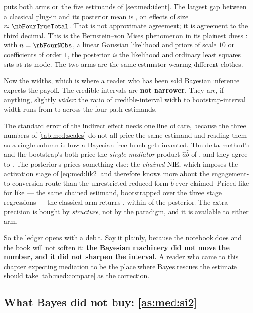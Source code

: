  puts both arms on the five estimands of \cref{sec:med:ident}. The largest gap
between a classical plug-in and its posterior mean is \nbFourMaxGap, on effects of size
$\approx \nbFourTrueTotal$. That is not approximate agreement; it is agreement to the third decimal.
This is the Bernstein--von Mises phenomenon in its plainest dress \citep{gelman2013}: with
$n = \nbFourNObs$, a linear Gaussian likelihood and priors of scale $10$ on coefficients of order
$1$, the posterior \emph{is} the likelihood and ordinary least squares sits at its mode. The two arms
are the same estimator wearing different clothes.

Now the widths, which is where a reader who has been sold Bayesian inference expects the payoff. The
credible intervals are \textbf{not narrower}. They are, if anything, slightly \emph{wider}: the ratio
of credible-interval width to bootstrap-interval width runs from \nbFourWidthMin{} to
\nbFourWidthMax{} across the four path estimands.

The standard error of the indirect effect needs one line of care, because the three numbers of
\cref{tab:med:scales} do not all price the same estimand and reading them as a single column is how
a Bayesian free lunch gets invented. The delta method's \nbFourSeDelta{} and the bootstrap's
\nbFourSeBoot{} both price the \emph{single-mediator} product $\hat a\hat b$ of
, and they agree to \pc{\nbFourSeGapPct}. The posterior's
\nbFourBayesNieSd{} prices something else: the \emph{chained} NIE, which imposes the activation
stage of \cref{eq:med:lik2} and therefore knows more about the engagement-to-conversion route than
the unrestricted reduced-form $\hat b$ ever claimed. Priced like for like --- the same chained
estimand, bootstrapped over the three stage regressions --- the classical arm returns
\nbFourSeBootChained, within \pc{\nbFourSeChainGapPct} of the posterior. The extra precision is
bought by \emph{structure}, not by the paradigm, and it is available to either arm.

So the ledger opens with a debit. Say it plainly, because the notebook does and the book will not
soften it: \textbf{the Bayesian machinery did not move the number, and it did not sharpen the
interval.} A reader who came to this chapter expecting mediation to be the place where Bayes rescues
the estimate should take \cref{tab:med:compare} as the correction.

\subsection*{What Bayes did not buy: \texorpdfstring{\cref{as:med:si2}}{Assumption 6.2}}


